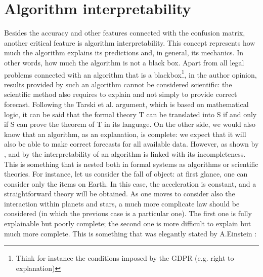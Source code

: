 \documentclass[12pt,%
               a4paper,%
               oneside,openany,%
               titlepage,%
               headinclude,footinclude,%
               BCOR5mm,%
               cleardoublepage=empty,%
               tablecaptionabove,%
               floatperchapter,
               ]{scrreprt}                 %
\begin{document}
\section{Algorithm interpretability}

Besides the accuracy and other features connected with the confusion matrix, another critical feature is algorithm interpretability. This concept represents how much the algorithm explains its predictions and, in general, its mechanics. In other words, how much the algorithm is not a black box. Apart from all legal problems connected with an algorithm that is a blackbox\footnote{Think for instance the conditions imposed by the GDPR (e.g. right to explanation)}, in the author opinion, results provided by such an algorithm cannot be considered scientific: the scientific method also requires to explain and not simply to provide correct forecast. Following the Tarski et al. \cite{tarski1953undecidable} argument, which is based on mathematical logic, it can be said that the formal theory T can be translated into S if and only if S can prove the theorem of T in its language. On the other side, we would also know that an algorithm, as an explanation, is complete: we expect that it will also be able to make correct forecasts for all available data. However, as shown by \cite{doshi2017towards}, and by \cite{gilpin2018explaining} the interpretability of an algorithm is linked with its incompleteness. This is something that is nested both in formal systems as algorithms or scientific theories. For instance, let us consider the fall of object: at first glance, one can consider only the items on Earth. In this case, the acceleration is constant, and a straightforward theory will be obtained.  As one moves to consider also the interaction within planets and stars, a much more complicate law should be considered (in which the previous case is a particular one). The first one is fully explainable but poorly complete; the second one is more difficult to explain but much more complete.  This is something that was elegantly stated by A.Einstein \cite{physics-reality}:
\end{document}
